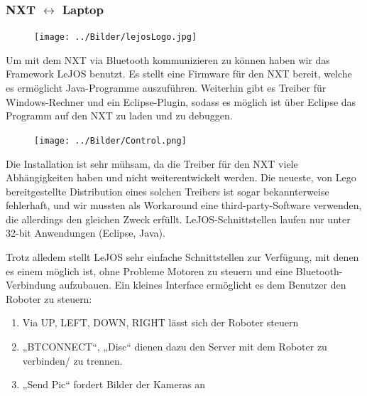 \documentclass[12pt,a4paper]{article}
\begin{document}
\subsubsection*{NXT $\leftrightarrow$ Laptop}
\begin{figure}
  \vspace{-40pt}
  \begin{center}
    \texttt{[image: ../Bilder/lejosLogo.jpg]}
  \end{center}
  \vspace{-15pt}
\end{figure}
Um mit dem NXT via Bluetooth kommunizieren zu können haben wir das Framework LeJOS benutzt.
Es stellt eine Firmware für den NXT bereit, welche es ermöglicht Java-Programme auszuführen.
Weiterhin gibt es Treiber für Windows-Rechner und ein Eclipse-Plugin, sodass es möglich ist über Eclipse das Programm auf den NXT zu laden und zu debuggen.
\begin{figure}
  \vspace{-30pt}
  \begin{center}
    \texttt{[image: ../Bilder/Control.png]}
  \end{center}
  \vspace{-15pt}
\end{figure}
Die Installation ist sehr mühsam, da die Treiber für den NXT viele Abhängigkeiten haben und nicht weiterentwickelt werden. Die neueste, von Lego bereitgestellte Distribution eines solchen Treibers ist sogar bekannterweise fehlerhaft, und wir mussten als Workaround eine third-party-Software verwenden, die allerdings den gleichen Zweck erfüllt.
LeJOS-Schnittstellen laufen nur unter 32-bit Anwendungen (Eclipse, Java).

Trotz alledem stellt LeJOS sehr einfache Schnittstellen zur Verfügung, mit denen es einem möglich ist, ohne Probleme Motoren zu steuern und eine Bluetooth-Verbindung aufzubauen.
Ein kleines Interface ermöglicht es dem Benutzer den Roboter zu steuern:
\begin{enumerate}
\item Via UP, LEFT, DOWN, RIGHT lässt sich der Roboter steuern
\item „BTCONNECT“, „Disc“ dienen dazu den Server mit dem Roboter zu verbinden/ zu trennen.
\item „Send Pic“ fordert Bilder der Kameras an
\end{enumerate}
\newpage
\end{document}
